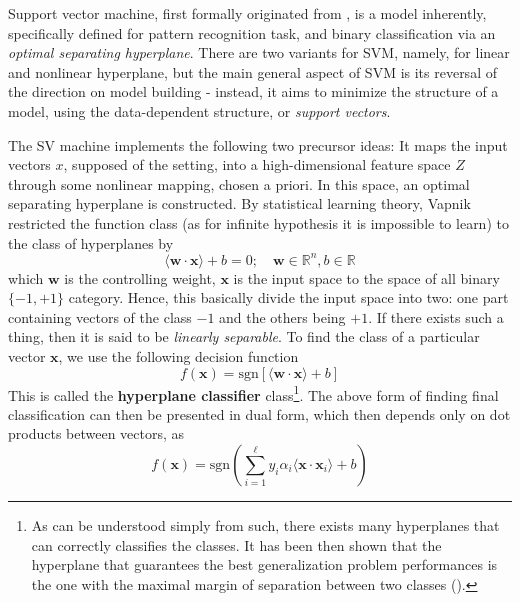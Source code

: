 \documentclass[
  journal=largetwo,
  year=2025,
  volume=37,
]{cup-journal}
\begin{document}
Support vector machine, first formally originated from \cite{Vapnik1999-VAPTNO}, is a model inherently, specifically defined for pattern recognition task, and binary classification via an \textit{optimal separating hyperplane}. There are two variants for SVM, namely, for linear and nonlinear hyperplane, but the main general aspect of SVM is its reversal of the direction on model building - instead, it aims to minimize the structure of a model, using the data-dependent structure, or \textit{support vectors}. 

The SV machine implements the following two precursor ideas: It maps the input vectors $x$, supposed of the setting, into a high-dimensional feature space $Z$ through some nonlinear mapping, chosen a priori. In this space, an optimal separating hyperplane is constructed. By statistical learning theory, Vapnik restricted the function class (as for infinite hypothesis it is impossible to learn) to the class of hyperplanes by 
\begin{equation}
    \langle \mathbf{w}\cdot \mathbf{x} \rangle + b = 0 ; \quad \mathbf{w}\in \mathbb{R}^{n} , b\in \mathbb{R}
\end{equation}
which $\mathbf{w}$ is the controlling weight, $\mathbf{x}$ is the input space to the space of all binary $\{-1,+1\}$ category. Hence, this basically divide the input space into two: one part containing vectors of the class $-1$ and the others being $+1$. If there exists such a thing, then it is said to be \textit{linearly separable}. To find the class of a particular vector $\mathbf{x}$, we use the following decision function 
\begin{equation}
    f(\mathbf{x}) = \mathrm{sgn}[\langle \mathbf{w}\cdot \mathbf{x}\rangle+ b]
\end{equation}
This is called the \textbf{hyperplane classifier} class\footnote{As can be understood simply from such, there exists many hyperplanes that can correctly classifies the classes. It has been then shown that the hyperplane that guarantees the best generalization problem performances is the one with the maximal margin of separation between two classes (\cite{Cristianini2000AnIT}).}. The above form of finding final classification can then be presented in dual form, which then depends only on dot products between vectors, as 
\begin{equation}
    f(\mathbf{x}) = \mathrm{sgn}\left(\sum^{\ell}_{i=1} y_{i}\alpha_{i} \langle \mathbf{x}\cdot \mathbf{x}_{i} \rangle+ b\right)
\end{equation} 
\end{document}
